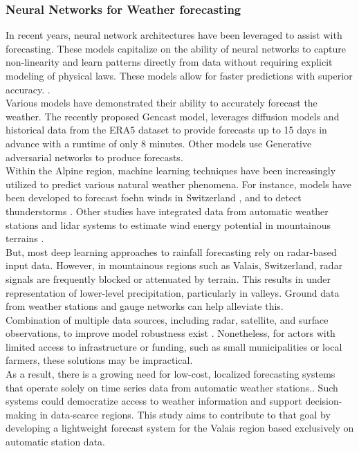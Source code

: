 \subsubsection{Neural Networks for Weather forecasting}

In recent years, neural network architectures have been leveraged to assist with forecasting. These models capitalize on the ability of neural networks to capture non-linearity and learn patterns directly from data without requiring explicit modeling of physical laws. These models allow for faster predictions with superior accuracy. \cite{abhishek2012weather, espeholt2022deep, keisler2022forecasting}. 
\\
Various models have demonstrated their ability to accurately forecast the weather. The recently proposed Gencast model, leverages diffusion models and historical data from the ERA5 dataset to provide forecasts up to 15 days in advance with a runtime of only 8 minutes. Other models use Generative adversarial networks to produce forecasts.\cite{baboo2010efficient, bi2023accurate, price2025probabilistic, li2024generative, ravuri2021skilful}
\\
Within the Alpine region, machine learning techniques have been increasingly utilized to predict various natural weather phenomena. For instance, models have been developed to forecast foehn winds in Switzerland \cite{aichinger2022machine}, and to detect thunderstorms \cite{perler2009study}. Other studies have integrated data from automatic weather stations and lidar systems to estimate wind energy potential in mountainous terrains \cite{kristianti2023combining}.
\\
But, most deep learning approaches to rainfall forecasting rely on radar-based input data.\cite{agrawal2019machine} However, in mountainous regions such as Valais, Switzerland, radar signals are frequently blocked or attenuated by terrain. This results in under representation of lower-level precipitation, particularly in valleys\cite{tobin2011improved}. Ground data from weather stations and gauge networks can help alleviate this.
\\
Combination of multiple data sources, including radar, satellite, and surface observations, to improve model robustness exist \cite{germann2022weather}. Nonetheless, for actors with limited access to infrastructure or funding, such as small municipalities or local farmers, these solutions may be impractical. 
\\
As a result, there is a growing need for low-cost, localized forecasting systems that operate solely on time series data from automatic weather stations.\cite{kuccukdermenci2024design}. Such systems could democratize access to weather information and support decision-making in data-scarce regions. This study aims to contribute to that goal by developing a lightweight forecast system for the Valais region based exclusively on automatic station data.